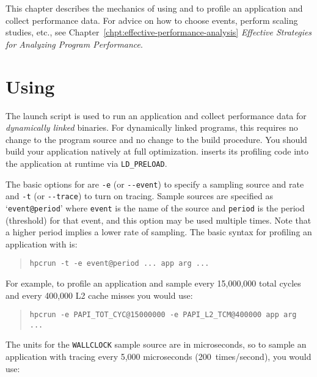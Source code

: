 
This chapter describes the mechanics of using \hpcrun{} and \hpclink{}
to profile an application and collect performance data.  For advice on
how to choose events, perform scaling studies, etc., see
Chapter~\ref{chpt:effective-performance-analysis} {\it Effective
Strategies for Analyzing Program Performance}.

\section{Using \hpcrun{}}

The \hpcrun{} launch script is used to run an application and collect
performance data for {\it dynamically linked\/} binaries.  For
dynamically linked programs, this requires no change to the program
source and no change to the build procedure.  You should build your
application natively at full optimization.  \hpcrun{} inserts its
profiling code into the application at runtime via \verb|LD_PRELOAD|.

The basic options for \hpcrun{} are \verb|-e| (or \verb|--event|) to
specify a sampling source and rate and \verb|-t| (or \verb|--trace|) to
turn on tracing.  Sample sources are specified as `\verb|event@period|'
where \verb|event| is the name of the source and \verb|period| is the
period (threshold) for that event, and this option may be used
multiple times.  Note that a higher period implies a lower rate of
sampling.  The basic syntax for profiling an application with
\hpcrun{} is:

\begin{quote}
\begin{verbatim}
hpcrun -t -e event@period ... app arg ...
\end{verbatim}
\end{quote}

For example, to profile an application and sample every 15,000,000
total cycles and every 400,000 L2 cache misses you would use:

\begin{quote}
\begin{verbatim}
hpcrun -e PAPI_TOT_CYC@15000000 -e PAPI_L2_TCM@400000 app arg ...
\end{verbatim}
\end{quote}

The units for the \verb|WALLCLOCK| sample source are in microseconds,
so to sample an application with tracing every 5,000 microseconds
(200~times/second), you would use:

